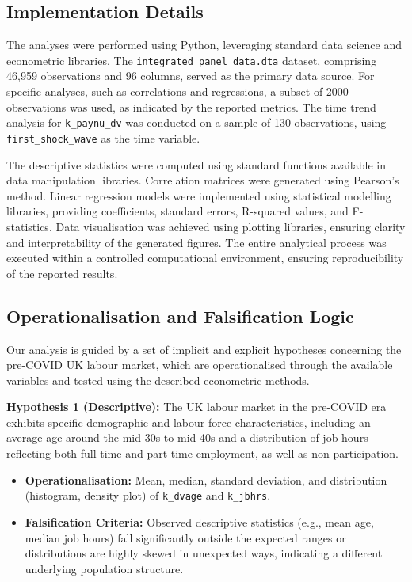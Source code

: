 \documentclass[11pt,a4paper]{article}
\begin{document}
\subsection{Implementation Details}

The analyses were performed using Python, leveraging standard data science and econometric libraries. The \texttt{integrated\_panel\_data.dta} dataset, comprising 46,959 observations and 96 columns, served as the primary data source. For specific analyses, such as correlations and regressions, a subset of 2000 observations was used, as indicated by the reported metrics. The time trend analysis for \texttt{k\_paynu\_dv} was conducted on a sample of 130 observations, using \texttt{first\_shock\_wave} as the time variable.

The descriptive statistics were computed using standard functions available in data manipulation libraries. Correlation matrices were generated using Pearson's method. Linear regression models were implemented using statistical modelling libraries, providing coefficients, standard errors, R-squared values, and F-statistics. Data visualisation was achieved using plotting libraries, ensuring clarity and interpretability of the generated figures. The entire analytical process was executed within a controlled computational environment, ensuring reproducibility of the reported results.

\subsection{Operationalisation and Falsification Logic}

Our analysis is guided by a set of implicit and explicit hypotheses concerning the pre-COVID UK labour market, which are operationalised through the available variables and tested using the described econometric methods.

\textbf{Hypothesis 1 (Descriptive):} The UK labour market in the pre-COVID era exhibits specific demographic and labour force characteristics, including an average age around the mid-30s to mid-40s and a distribution of job hours reflecting both full-time and part-time employment, as well as non-participation.
\begin{itemize}
    \item \textbf{Operationalisation:} Mean, median, standard deviation, and distribution (histogram, density plot) of \texttt{k\_dvage} and \texttt{k\_jbhrs}.
    \item \textbf{Falsification Criteria:} Observed descriptive statistics (e.g., mean age, median job hours) fall significantly outside the expected ranges or distributions are highly skewed in unexpected ways, indicating a different underlying population structure.
\end{itemize}
\end{document}
